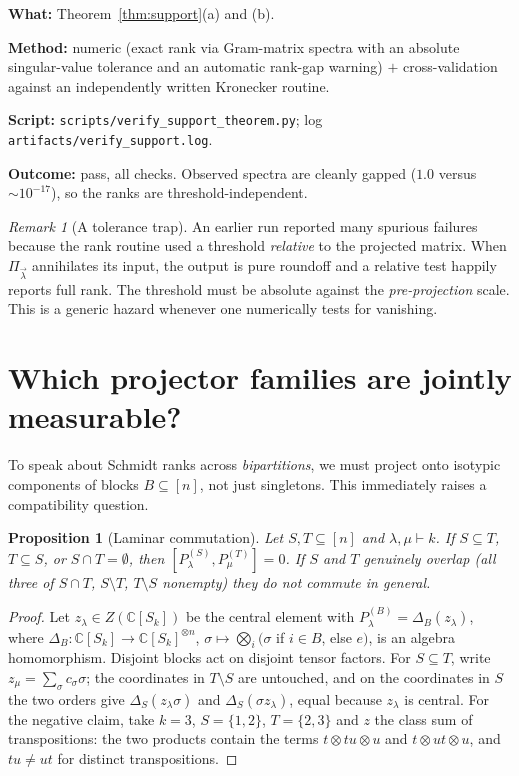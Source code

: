 \documentclass[11pt]{article}
\newtheorem{proposition}[theorem]{Proposition}
\theoremstyle{definition}
\theoremstyle{remark}
\newtheorem{remark}[theorem]{Remark}
\newcommand{\bmlam}{\vec{\lambda}}
\newcommand{\Cx}{\mathbb{C}}
\begin{document}
\begin{verification}
\textbf{What:} Theorem~\ref{thm:support}(a) and (b).

\textbf{Method:} numeric (exact rank via Gram-matrix spectra with an absolute
singular-value tolerance and an automatic rank-gap warning) $+$ cross-validation
against an independently written Kronecker routine.

\textbf{Script:} \texttt{scripts/verify\_support\_theorem.py};
log \texttt{artifacts/verify\_support.log}.

\textbf{Outcome:} pass, all checks. Observed spectra are cleanly gapped
($1.0$ versus $\sim 10^{-17}$), so the ranks are threshold-independent.
\end{verification}

\begin{remark}[A tolerance trap]
An earlier run reported many spurious failures because the rank routine used a
threshold \emph{relative} to the projected matrix. When $\Pi_{\bmlam}$ annihilates its
input, the output is pure roundoff and a relative test happily reports full rank. The
threshold must be absolute against the \emph{pre-projection} scale. This is a generic
hazard whenever one numerically tests for vanishing.
\end{remark}

\section{Which projector families are jointly measurable?}
\label{sec:commutation}

To speak about Schmidt ranks across \emph{bipartitions}, we must project onto isotypic
components of blocks $B \subseteq [n]$, not just singletons. This immediately raises a
compatibility question.

\begin{proposition}[Laminar commutation]
\label{prop:laminar}
Let $S, T \subseteq [n]$ and $\lambda, \mu \vdash k$. If $S \subseteq T$,
$T \subseteq S$, or $S \cap T = \emptyset$, then
$[P^{(S)}_\lambda, P^{(T)}_\mu] = 0$. If $S$ and $T$ genuinely overlap (all three of
$S \cap T$, $S \setminus T$, $T \setminus S$ nonempty) they do not commute in general.
\end{proposition}

\begin{proof}
Let $z_\lambda \in Z(\Cx[S_k])$ be the central element with
$P^{(B)}_\lambda = \Delta_B(z_\lambda)$, where
$\Delta_B : \Cx[S_k] \to \Cx[S_k]^{\otimes n}$,
$\sigma \mapsto \bigotimes_i (\sigma$ if $i \in B$, else $e)$, is an algebra
homomorphism. Disjoint blocks act on disjoint tensor factors. For $S \subseteq T$,
write $z_\mu = \sum_\sigma c_\sigma \sigma$; the coordinates in $T \setminus S$ are
untouched, and on the coordinates in $S$ the two orders give
$\Delta_S(z_\lambda \sigma)$ and $\Delta_S(\sigma z_\lambda)$, equal because
$z_\lambda$ is central. For the negative claim, take $k = 3$, $S = \{1,2\}$,
$T = \{2,3\}$ and $z$ the class sum of transpositions: the two products contain the
terms $t \otimes tu \otimes u$ and $t \otimes ut \otimes u$, and $tu \ne ut$ for
distinct transpositions.
\end{proof}
\end{document}
